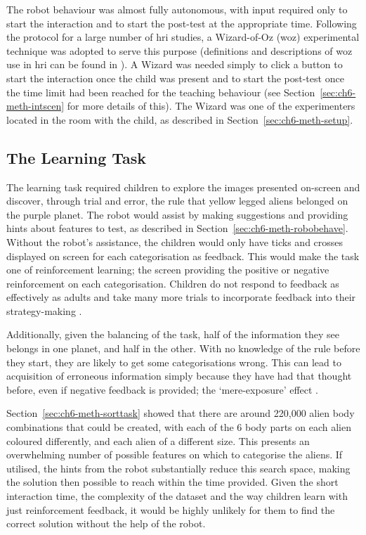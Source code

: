 The robot behaviour was almost fully autonomous, with input required only to start the interaction and to start the post-test at the appropriate time. Following the protocol for a large number of \acrshort{hri} studies, a Wizard-of-Oz (\acrshort{woz}) experimental technique was adopted to serve this purpose (definitions and descriptions of \acrshort{woz} use in \acrshort{hri} can be found in \citealp{riek2012wizard}). A Wizard was needed simply to click a button to start the interaction once the child was present and to start the post-test once the time limit had been reached for the teaching behaviour (see Section~\ref{sec:ch6-meth-intscen} for more details of this). The Wizard was one of the experimenters located in the room with the child, as described in Section~\ref{sec:ch6-meth-setup}.

\subsection{The Learning Task}\label{sec:ch6-learning-task}
The learning task required children to explore the images presented on-screen and discover, through trial and error, the rule that yellow legged aliens belonged on the purple planet. The robot would assist by making suggestions and providing hints about features to test, as described in Section~\ref{sec:ch6-meth-robobehave}. Without the robot's assistance, the children would only have ticks and crosses displayed on screen for each categorisation as feedback. This would make the task one of reinforcement learning; the screen providing the positive or negative reinforcement on each categorisation. Children do not respond to feedback as effectively as adults and take many more trials to incorporate feedback into their strategy-making \citep{crone2004developmental}.

Additionally, given the balancing of the task, half of the information they see belongs in one planet, and half in the other. With no knowledge of the rule before they start, they are likely to get some categorisations wrong. This can lead to acquisition of erroneous information simply because they have had that thought before, even if negative feedback is provided; the `mere-exposure' effect \citep{begg1985believing, roediger2006power}.

Section~\ref{sec:ch6-meth-sorttask} showed that there are around 220,000 alien body combinations that could be created, with each of the 6 body parts on each alien coloured differently, and each alien of a different size. This presents an overwhelming number of possible features on which to categorise the aliens. If utilised, the hints from the robot substantially reduce this search space, making the solution then possible to reach within the time provided. Given the short interaction time, the complexity of the dataset and the way children learn with just reinforcement feedback, it would be highly unlikely for them to find the correct solution without the help of the robot.

